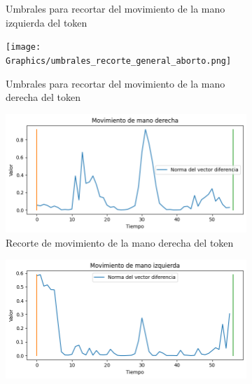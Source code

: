 \begin{figure}[t]
\begin{subfigure}[t]{0.3\textwidth}
		\caption{Umbrales para recortar del movimiento de la mano izquierda del token }
		\label{f:lhand_movediff_amar}
	\end{subfigure}
		\begin{subfigure}[t]{0.3\textwidth}
	\centering
		\texttt{[image: Graphics/umbrales\_recorte\_general\_aborto.png]}
		\caption{Umbrales para recortar del movimiento de la mano derecha del token  }
		\label{f:general_movediff_amar}
	\end{subfigure}
	\vskip 0pt
	\begin{subfigure}[t]{0.3\textwidth}
	\centering
		\includegraphics[align=t,width=0.9\linewidth, height =0.9\linewidth]{Graphics/recorte_rhand_aborto.png}
		\caption{Recorte de movimiento de la mano derecha del token  }
		\label{f:rhand_movediff_aborto}
	\end{subfigure}
	\begin{subfigure}[t]{0.3\textwidth}
	\centering
		\includegraphics[align=t,width=0.9\linewidth, height=0.9\linewidth]{Graphics/recorte_lhand_aborto.png}

\end{subfigure}
\end{figure}
